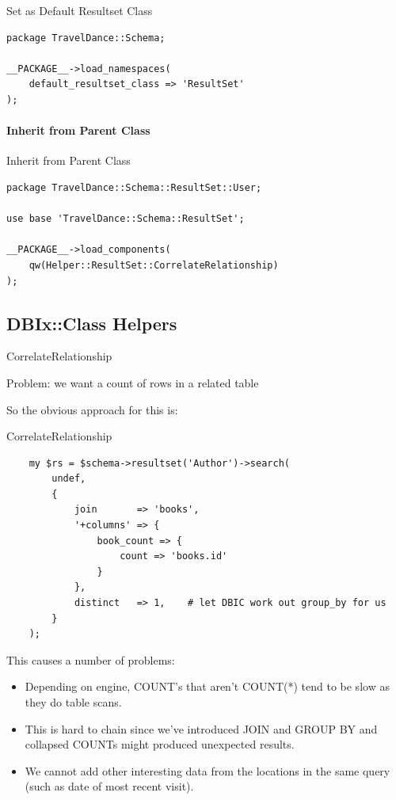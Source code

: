 \begin{frame}[fragile]{Set as Default Resultset Class}
\begin{lstlisting}
package TravelDance::Schema;

__PACKAGE__->load_namespaces(
    default_resultset_class => 'ResultSet'
);

\end{lstlisting}
\end{frame}

\paragraph{Inherit from Parent Class}
\begin{frame}[fragile]{Inherit from Parent Class}
\begin{lstlisting}
package TravelDance::Schema::ResultSet::User;

use base 'TravelDance::Schema::ResultSet';

__PACKAGE__->load_components(
    qw(Helper::ResultSet::CorrelateRelationship)
);
\end{lstlisting}
\end{frame}

\subsection{DBIx::Class Helpers}

\begin{frame}{CorrelateRelationship}

Problem: we want a count of rows in a related table

\end{frame}

So the obvious approach for this is:

\begin{frame}[fragile]{CorrelateRelationship}
\begin{lstlisting}
    my $rs = $schema->resultset('Author')->search(
        undef,
        {
            join       => 'books',
            '+columns' => {
                book_count => {
                    count => 'books.id'
                }
            },
            distinct   => 1,    # let DBIC work out group_by for us
        }
    );
\end{lstlisting}
\end{frame}
This causes a number of problems:

\begin{itemize}
\item Depending on engine, COUNT’s that aren’t COUNT(*) tend to be slow as
they do table scans.
\item This is hard to chain since we've introduced JOIN and GROUP BY and
collapsed COUNTs might produced unexpected results.
\item We cannot add other interesting data from the locations in the same query (such as date of most recent visit).
\end{itemize}

